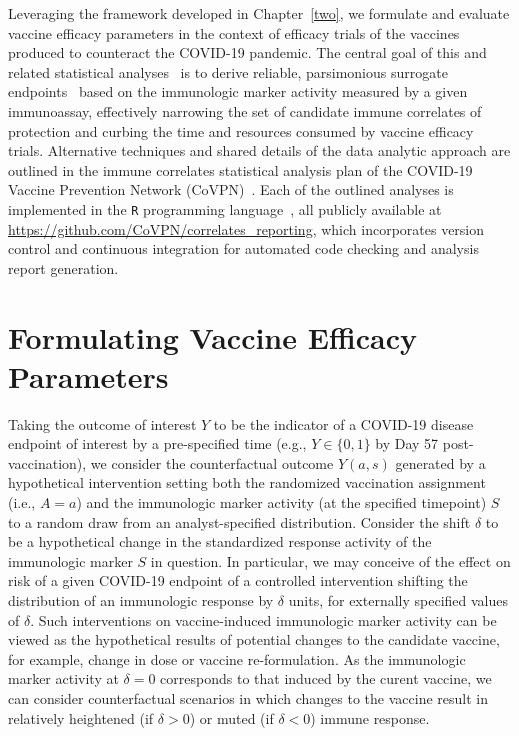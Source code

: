 Leveraging the framework developed in Chapter~\ref{two}, we formulate and
evaluate vaccine efficacy parameters in the context of efficacy trials of the
vaccines produced to counteract the COVID-19 pandemic. The central goal of this
and related statistical analyses~\citep[e.g.,][]{benkeser2021inference,
gilbert2021assessment} is to derive reliable, parsimonious surrogate
endpoints~\citep{prentice1989surrogate, gilbert2008evaluating} based on the
immunologic marker activity measured by a given immunoassay, effectively
narrowing the set of candidate immune correlates of protection and curbing the
time and resources consumed by vaccine efficacy trials. Alternative techniques
and shared details of the data analytic approach are outlined in the immune
correlates statistical analysis plan of the COVID-19 Vaccine Prevention Network
(CoVPN)~\citep{gilbert2021covpn}. Each of the outlined analyses is implemented
in the \texttt{R} programming language~\citep{R}, all publicly available at
\url{https://github.com/CoVPN/correlates_reporting}, which incorporates version
control and continuous integration for automated code checking and analysis
report generation.

\section{Formulating Vaccine Efficacy Parameters}

Taking the outcome of interest $Y$ to be the indicator of a COVID-19 disease
endpoint of interest by a pre-specified time (e.g., $Y \in \{0, 1\}$ by Day 57
post-vaccination), we consider the counterfactual outcome $Y(a,s)$ generated by
a hypothetical intervention setting both the randomized vaccination assignment
(i.e., $A = a$) and the immunologic marker activity (at the specified timepoint)
$S$ to a random draw from an analyst-specified distribution. Consider the shift
$\delta$ to be a hypothetical change in the standardized response activity of
the immunologic marker $S$ in question. In particular, we may conceive of the
effect on risk of a given COVID-19 endpoint of a controlled intervention
shifting the distribution of an immunologic response by $\delta$ units, for
externally specified values of $\delta$. Such interventions on vaccine-induced
immunologic marker activity can be viewed as the hypothetical results of
potential changes to the candidate vaccine, for example, change in dose or
vaccine re-formulation. As the immunologic marker activity at $\delta = 0$
corresponds to that induced by the curent vaccine, we can consider
counterfactual scenarios in which changes to the vaccine result in relatively
heightened (if $\delta > 0$) or muted (if $\delta < 0$) immune response.


